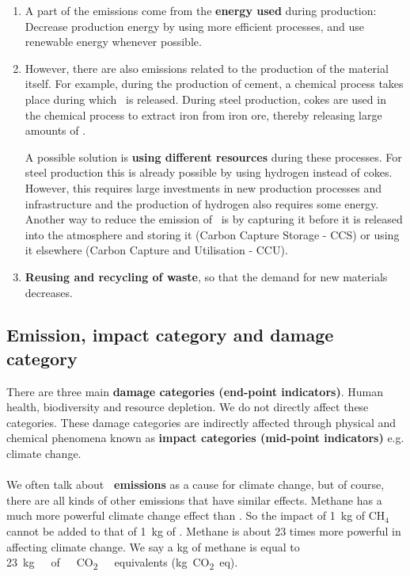 \documentclass[../summary.tex]{subfiles}
\begin{document}
\begin{enumerate}
	\item A part of the emissions come from the \textbf{energy used} during production: Decrease production energy by using more efficient processes, and use renewable energy whenever possible.
	\item However, there are also emissions related to the production of the material itself. For example, during the production of cement, a chemical process takes place during which \COtwo\ is released. During steel production, cokes are used in the chemical process to extract iron from iron ore, thereby releasing large amounts of \COtwo.

	      A possible solution is \textbf{using different resources} during these processes. For steel production this is already possible by using hydrogen instead of cokes. However, this requires large investments in new production processes and infrastructure and the production of hydrogen also requires some energy. Another way to reduce the emission of \COtwo\ is by capturing it before it is released into the atmosphere and storing it (Carbon Capture Storage - CCS) or using it elsewhere (Carbon Capture and Utilisation - CCU).
	\item \textbf{Reusing and recycling of waste}, so that the demand for new materials decreases.

\end{enumerate}

\subsection{Emission, impact category and damage category}

There are three main \textbf{damage categories (end-point indicators)}. Human health, biodiversity and resource depletion. We do not directly affect these categories. These damage categories are indirectly affected through physical and chemical phenomena known as \textbf{impact categories (mid-point indicators)} e.g. climate change.
\\\\
We often talk about \textbf{\boldmath \COtwo\ emissions} as a cause for climate change, but of course, there are all kinds of other emissions that have similar effects. Methane has a much more powerful climate change effect than \COtwo. So the impact of \SI{1}{\kilogram} of $\mathrm{CH_{4}}$ cannot be added to that of \SI{1}{\kilogram} of \COtwo. Methane is about 23 times more powerful in affecting climate change. We say a \unit{\kilogram} of methane is equal to \SI{23}{\kilogram\ of\ CO_2\ equivalents} (\unit{\kilogram CO_2 eq}).
\end{document}
